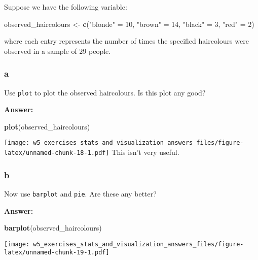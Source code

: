 \documentclass[]{article}
\newenvironment{Shaded}{\begin{snugshade}}{\end{snugshade}}
\newcommand{\DecValTok}[1]{\textcolor[rgb]{0.00,0.00,0.81}{#1}}
\newcommand{\KeywordTok}[1]{\textcolor[rgb]{0.13,0.29,0.53}{\textbf{#1}}}
\newcommand{\NormalTok}[1]{#1}
\newcommand{\StringTok}[1]{\textcolor[rgb]{0.31,0.60,0.02}{#1}}
\begin{document}
Suppose we have the following variable:

\begin{Shaded}
\begin{Highlighting}[]
\NormalTok{observed_haircolours <-}\StringTok{ }\KeywordTok{c}\NormalTok{(}\StringTok{"blonde"}\NormalTok{ =}\StringTok{  }\DecValTok{10}\NormalTok{, }\StringTok{"brown"}\NormalTok{ =}\StringTok{ }\DecValTok{14}\NormalTok{, }\StringTok{"black"}\NormalTok{ =}\StringTok{ }\DecValTok{3}\NormalTok{, }\StringTok{"red"}\NormalTok{ =}\StringTok{ }\DecValTok{2}\NormalTok{)}
\end{Highlighting}
\end{Shaded}

where each entry represents the number of times the specified
haircolours were observed in a sample of 29 people.

\hypertarget{a-4}{%
\subsubsection{a}\label{a-4}}

Use \texttt{plot} to plot the observed haircolours. Is this plot any
good?

\textbf{Answer:}

\begin{Shaded}
\begin{Highlighting}[]
\KeywordTok{plot}\NormalTok{(observed_haircolours)}
\end{Highlighting}
\end{Shaded}

\texttt{[image: w5\_exercises\_stats\_and\_visualization\_answers\_files/figure-latex/unnamed-chunk-18-1.pdf]}
This isn't very useful.

\hypertarget{b-4}{%
\subsubsection{b}\label{b-4}}

Now use \texttt{barplot} and \texttt{pie}. Are these any better?

\textbf{Answer:}

\begin{Shaded}
\begin{Highlighting}[]
\KeywordTok{barplot}\NormalTok{(observed_haircolours)}
\end{Highlighting}
\end{Shaded}

\texttt{[image: w5\_exercises\_stats\_and\_visualization\_answers\_files/figure-latex/unnamed-chunk-19-1.pdf]}
\end{document}

